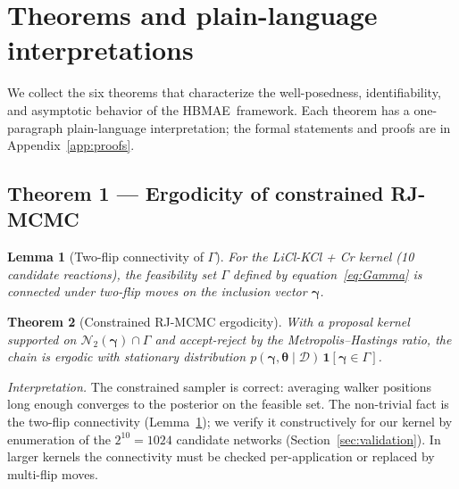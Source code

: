 \documentclass[12pt]{article}
\theoremstyle{plain}
\newtheorem{theorem}{Theorem}
\newtheorem{lemma}[theorem]{Lemma}
\theoremstyle{definition}
\theoremstyle{remark}
\newcommand{\HBMAE}{HBMAE\xspace}
\begin{document}
\section{Theorems and plain-language interpretations}\label{sec:theorems}

We collect the six theorems that characterize the well-posedness,
identifiability, and asymptotic behavior of the \HBMAE\ framework.  Each
theorem has a one-paragraph plain-language interpretation; the formal
statements and proofs are in Appendix~\ref{app:proofs}.

\subsection{Theorem 1 --- Ergodicity of constrained RJ-MCMC}\label{sec:thm1}

\begin{lemma}[Two-flip connectivity of $\Gamma$]\label{lem:connectivity}
For the LiCl-KCl + Cr kernel (10 candidate reactions), the feasibility set
$\Gamma$ defined by equation~\eqref{eq:Gamma} is connected under two-flip
moves on the inclusion vector $\boldsymbol\gamma$.
\end{lemma}

\begin{theorem}[Constrained RJ-MCMC ergodicity]\label{thm:ergodicity}
With a proposal kernel supported on $\mathcal{N}_2(\boldsymbol\gamma)\cap\Gamma$
and accept-reject by the Metropolis--Hastings ratio, the chain is ergodic with
stationary distribution $p(\boldsymbol\gamma,\boldsymbol\theta\mid\mathcal{D})\,\mathbf{1}[\boldsymbol\gamma\in\Gamma]$.
\end{theorem}

\emph{Interpretation.}  The constrained sampler is correct: averaging walker
positions long enough converges to the posterior on the feasible set.  The
non-trivial fact is the two-flip connectivity (Lemma~\ref{lem:connectivity});
we verify it constructively for our kernel by enumeration of the
$2^{10}=1024$ candidate networks (Section~\ref{sec:validation}).  In larger
kernels the connectivity must be checked per-application or replaced by
multi-flip moves.

\end{document}
